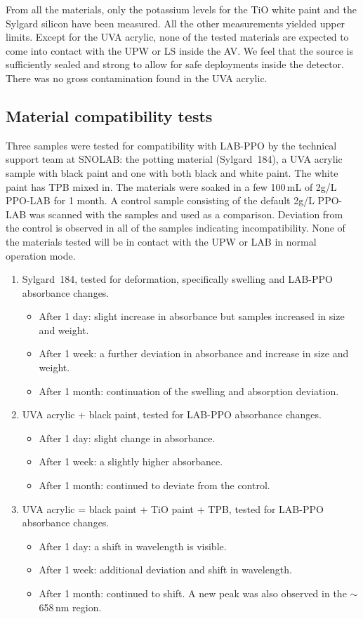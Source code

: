From all the materials, only the potassium levels for the TiO white paint and the Sylgard silicon have been measured. All the other measurements yielded upper limits. Except for the UVA acrylic, none of the tested materials are expected to come into contact with the UPW or LS inside the AV. We feel that the source is sufficiently sealed and strong to allow for safe deployments inside the detector. There was no gross contamination found in the UVA acrylic.

\subsection{Material compatibility tests}
\label{sec:comptest}
Three samples were tested for compatibility with LAB-PPO by the technical support team at SNOLAB: the potting material (Sylgard~184), a UVA acrylic sample with black paint and one with both black and white paint. The white paint has TPB mixed in. The materials were soaked in a few 100\,mL of 2g/L PPO-LAB for 1 month. A control sample consisting of the default 2g/L PPO-LAB was scanned with the samples and used as a comparison. Deviation from the control is observed in all of the samples indicating incompatibility. None of the materials tested will be in contact with the UPW or LAB in normal operation mode.
\begin{enumerate}
    \item Sylgard~184, tested for deformation, specifically swelling and LAB-PPO absorbance changes.
    \begin{itemize}
        \setlength{\itemsep}{-0.2cm}
        \item After 1 day: slight increase in absorbance but samples increased in size and weight.
        \item After 1 week: a further deviation in absorbance and increase in size and weight.
        \item After 1 month: continuation of the swelling and absorption deviation. 
    \end{itemize}
    \item UVA acrylic + black paint, tested for LAB-PPO absorbance changes.
    \begin{itemize}
        \setlength{\itemsep}{-0.2cm}
        \item After 1 day: slight change in absorbance.
        \item After 1 week: a slightly higher absorbance.
        \item After 1 month: continued to deviate from the control.
    \end{itemize}
    \item UVA acrylic = black paint + TiO paint + TPB, tested for LAB-PPO absorbance changes.
    \begin{itemize}
        \setlength{\itemsep}{-0.2cm}
        \item After 1 day: a shift in wavelength is visible.
        \item After 1 week: additional deviation and shift in wavelength.
        \item After 1 month: continued to shift. A new peak was also observed in the $\sim$658\,nm region.
    \end{itemize}
\end{enumerate}

